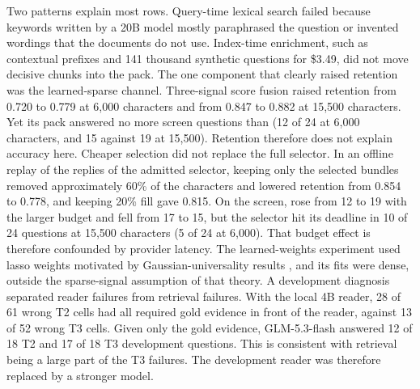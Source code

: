 \documentclass[preprint,12pt]{elsarticle}
\begin{document}
Two patterns explain most rows.
Query-time lexical search failed because keywords written by a 20B model mostly paraphrased the question or invented wordings that the documents do not use.
Index-time enrichment, such as contextual prefixes and 141 thousand synthetic questions for \$3.49, did not move decisive chunks into the pack.
The one component that clearly raised retention was the learned-sparse channel.
Three-signal score fusion raised retention from 0.720 to 0.779 at 6,000 characters and from 0.847 to 0.882 at 15,500 characters. Yet its pack answered no more screen questions than \hybrid{} (12 of 24 at 6,000 characters, and 15 against 19 at 15,500).
Retention therefore does not explain accuracy here.
Cheaper selection did not replace the full selector.
In an offline replay of the replies of the admitted selector, keeping only the selected bundles removed approximately 60\% of the characters and lowered retention from 0.854 to 0.778, and keeping 20\% fill gave 0.815.
On the screen, \hybrid{} rose from 12 to 19 with the larger budget and \lexb{} fell from 17 to 15, but the selector hit its deadline in 10 of 24 questions at 15,500 characters (5 of 24 at 6,000). That budget effect is therefore confounded by provider latency.
The learned-weights experiment used lasso weights motivated by Gaussian-universality results \citep{mesforush2026lasso}, and its fits were dense, outside the sparse-signal assumption of that theory.
A development diagnosis separated reader failures from retrieval failures.
With the local 4B reader, 28 of 61 wrong T2 cells had all required gold evidence in front of the reader, against 13 of 52 wrong T3 cells.
Given only the gold evidence, GLM-5.3-flash answered 12 of 18 T2 and 17 of 18 T3 development questions.
This is consistent with retrieval being a large part of the T3 failures. The development reader was therefore replaced by a stronger model.
\end{document}
